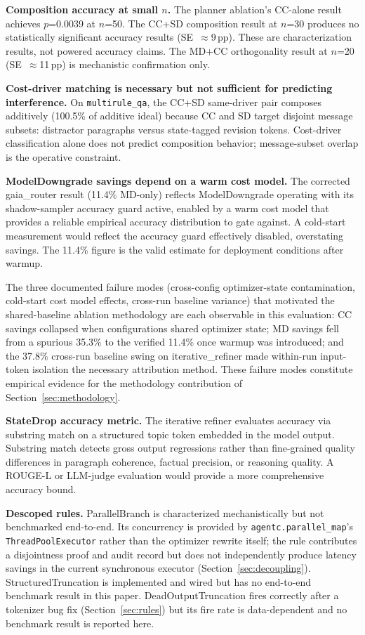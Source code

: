 \documentclass[sigconf,9pt]{acmart}
\begin{document}
\textbf{Composition accuracy at small $n$.} The planner ablation's CC-alone result
achieves $p$=0.0039 at $n$=50. The CC+SD composition result at $n$=30 produces no
statistically significant accuracy results (SE~$\approx$9\,pp). These are
characterization results, not powered accuracy claims. The MD+CC orthogonality result
at $n$=20 (SE~$\approx$11\,pp) is mechanistic confirmation only.

\textbf{Cost-driver matching is necessary but not sufficient for predicting
interference.} On \texttt{multirule\_qa}, the CC+SD same-driver pair composes
additively (100.5\% of additive ideal) because CC and SD target disjoint message
subsets: distractor paragraphs versus state-tagged revision tokens. Cost-driver
classification alone does not predict composition behavior; message-subset overlap is
the operative constraint.

\textbf{ModelDowngrade savings depend on a warm cost model.} The corrected
gaia\_router result (11.4\% MD-only) reflects ModelDowngrade operating with its
shadow-sampler accuracy guard active, enabled by a warm cost model that provides a
reliable empirical accuracy distribution to gate against. A cold-start measurement
would reflect the accuracy guard effectively disabled, overstating savings. The 11.4\%
figure is the valid estimate for deployment conditions after warmup.

The three documented failure modes (cross-config optimizer-state contamination,
cold-start cost model effects, cross-run baseline variance) that motivated the
shared-baseline ablation methodology are each observable in this evaluation: CC
savings collapsed when configurations shared optimizer state; MD savings fell from a
spurious 35.3\% to the verified 11.4\% once warmup was introduced; and the 37.8\%
cross-run baseline swing on iterative\_refiner made within-run input-token isolation
the necessary attribution method. These failure modes constitute empirical evidence for
the methodology contribution of Section~\ref{sec:methodology}.

\textbf{StateDrop accuracy metric.} The iterative refiner evaluates accuracy via
substring match on a structured topic token embedded in the model output. Substring
match detects gross output regressions rather than fine-grained quality differences in
paragraph coherence, factual precision, or reasoning quality. A ROUGE-L or LLM-judge
evaluation would provide a more comprehensive accuracy bound.

\textbf{Descoped rules.} ParallelBranch is characterized mechanistically but not
benchmarked end-to-end. Its concurrency is provided by
\texttt{agentc.parallel\_map}'s \texttt{ThreadPoolExecutor} rather than the
optimizer rewrite itself; the rule contributes a disjointness proof and audit record
but does not independently produce latency savings in the current synchronous
executor (Section~\ref{sec:decoupling}). StructuredTruncation is implemented and
wired but has no end-to-end benchmark result in this paper.
DeadOutputTruncation fires correctly after a tokenizer bug fix
(Section~\ref{sec:rules}) but its fire rate is data-dependent and no benchmark
result is reported here.
\end{document}
